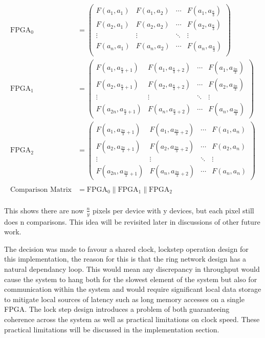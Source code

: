 \begin{align*}
\text{FPGA}_0
 &=
 \begin{pmatrix}
  F(a_{1},a_{1}) & F(a_{1},a_{2})  & \cdots & F(a_{1},a_{\frac{n}{3} }) \\
  F(a_{2},a_{1}) & F(a_{2},a_{2})  & \cdots & F(a_{2},a_{\frac{n}{3} }) \\
  \vdots  & \vdots & \ddots & \vdots   \\
  F(a_{n},a_{1}) & F(a_{n},a_{2})  & \cdots & F(a_{n},a_{\frac{n}{3} }) \\
 \end{pmatrix} \\
\text{FPGA}_1
 &=
 \begin{pmatrix}
  F(a_{1},a_{\frac{n}{3}+1}) & F(a_{1},a_{\frac{n}{3}+2})  & \cdots & F(a_{1},a_{\frac{2n}{3}}) \\
  F(a_{2},a_{\frac{n}{3}+1}) & F(a_{2},a_{\frac{n}{3}+2})  & \cdots & F(a_{2},a_{\frac{2n}{3}}) \\
  \vdots  & \vdots & \ddots & \vdots   \\
  F(a_{2n},a_{\frac{n}{3}+1}) & F(a_{n},a_{\frac{n}{3}+2})  & \cdots & F(a_{n},a_{\frac{2n}{3}})
 \end{pmatrix} \\
 \text{FPGA}_2
 &=
 \begin{pmatrix}
  F(a_{1},a_{\frac{2n}{3}+1}) & F(a_{1},a_{\frac{2n}{3}+2})  & \cdots & F(a_{1},a_{n}) \\
  F(a_{2},a_{\frac{2n}{3}+1}) & F(a_{2},a_{\frac{2n}{3}+2})  & \cdots & F(a_{2},a_{n}) \\
  \vdots  & \vdots & \ddots & \vdots   \\
  F(a_{2n},a_{\frac{2n}{3}+1}) & F(a_{n},a_{\frac{2n}{3}+2})  & \cdots & F(a_{n},a_{n})
 \end{pmatrix} \\
 \\
\text{Comparison Matrix} &= \text{FPGA}_0 \parallel \text{FPGA}_1 \parallel \text{FPGA}_2 \\
\end{align*} 


This shows there are now $\frac{n}{y}$ pixels per device with y devices, but each pixel still does n comparisons. This idea will be revisited later in discussions of other future work.
 
The decision was made to favour a shared clock, lockstep operation design for this implementation, the reason for this is that the ring network design has a natural dependancy loop. This would mean any discrepancy in throughput would cause the system to  hang both for the slowest element of the system but also for communication within the system and would require significant local data storage to mitigate local sources of latency such as long memory accesses on a single FPGA. The lock step design introduces a problem of both guaranteeing coherence across the system as well as practical limitations on clock speed. These practical limitations will be discussed in the implementation section.



